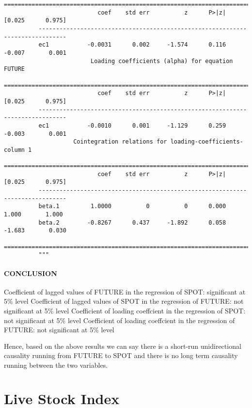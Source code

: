 \documentclass[11pt]{article}
\begin{document}
\begin{Verbatim}[commandchars=\\\{\}]
          ==============================================================================
                           coef    std err          z      P>|z|      [0.025      0.975]
          ------------------------------------------------------------------------------
          ec1           -0.0031      0.002     -1.574      0.116      -0.007       0.001
                         Loading coefficients (alpha) for equation FUTURE               
          ==============================================================================
                           coef    std err          z      P>|z|      [0.025      0.975]
          ------------------------------------------------------------------------------
          ec1           -0.0010      0.001     -1.129      0.259      -0.003       0.001
                    Cointegration relations for loading-coefficients-column 1           
          ==============================================================================
                           coef    std err          z      P>|z|      [0.025      0.975]
          ------------------------------------------------------------------------------
          beta.1         1.0000          0          0      0.000       1.000       1.000
          beta.2        -0.8267      0.437     -1.892      0.058      -1.683       0.030
          ==============================================================================
          """
\end{Verbatim}
            
    \paragraph{CONCLUSION}\label{conclusion}

    Coefficient of lagged values of FUTURE in the regression of SPOT:
significant at 5\% level Coefficient of lagged values of SPOT in the
regression of FUTURE: not significant at 5\% level Coefficient of
loading coeffcient in the regression of SPOT: not significant at 5\%
level Coefficient of loading coeffcient in the regression of FUTURE: not
significant at 5\% level

Hence, based on the above results we can say there is a short-run
unidirectional causality running from FUTURE to SPOT and there is no
long term causality running between the two variables.

    \section{Live Stock Index}\label{live-stock-index}
\end{document}
